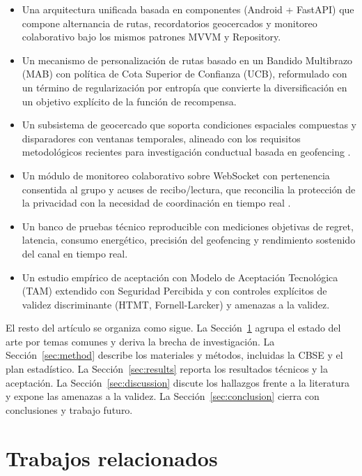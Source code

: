\documentclass[a4paper,fleqn]{cas-sc}
\newcommand{\UCB}{UCB\xspace}
\newcommand{\MAB}{MAB\xspace}
\newcommand{\TAM}{TAM\xspace}
\newcommand{\CBSE}{CBSE\xspace}
\newcommand{\MVVM}{MVVM\xspace}
\begin{document}
	\begin{itemize}
		\item Una arquitectura unificada basada en componentes (Android + FastAPI) que compone alternancia de rutas, recordatorios geocercados y monitoreo colaborativo bajo los mismos patrones \MVVM y Repository.
		\item Un mecanismo de personalizaci\'on de rutas basado en un Bandido Multibrazo (\MAB) con pol\'itica de Cota Superior de Confianza (\UCB), reformulado con un t\'ermino de regularizaci\'on por entrop\'ia que convierte la diversificaci\'on en un objetivo expl\'icito de la funci\'on de recompensa.
		\item Un subsistema de geocercado que soporta condiciones espaciales compuestas y disparadores con ventanas temporales, alineado con los requisitos metodol\'ogicos recientes para investigaci\'on conductual basada en geofencing \citep{shevchenko2024geofencing}.
		\item Un m\'odulo de monitoreo colaborativo sobre WebSocket con pertenencia consentida al grupo y acuses de recibo/lectura, que reconcilia la protecci\'on de la privacidad con la necesidad de coordinaci\'on en tiempo real \citep{li2017locsharing,mckenzie2022privyto}.
		\item Un banco de pruebas t\'ecnico reproducible con mediciones objetivas de regret, latencia, consumo energ\'etico, precisi\'on del geofencing y rendimiento sostenido del canal en tiempo real.
		\item Un estudio emp\'irico de aceptaci\'on con Modelo de Aceptaci\'on Tecnol\'ogica (\TAM) extendido con Seguridad Percibida y con controles expl\'icitos de validez discriminante (HTMT, Fornell-Larcker) y amenazas a la validez.
	\end{itemize}
	
	El resto del art\'iculo se organiza como sigue. La Secci\'on~\ref{sec:related} agrupa el estado del arte por temas comunes y deriva la brecha de investigaci\'on. La Secci\'on~\ref{sec:method} describe los materiales y m\'etodos, incluidas la \CBSE y el plan estad\'istico. La Secci\'on~\ref{sec:results} reporta los resultados t\'ecnicos y la aceptaci\'on. La Secci\'on~\ref{sec:discussion} discute los hallazgos frente a la literatura y expone las amenazas a la validez. La Secci\'on~\ref{sec:conclusion} cierra con conclusiones y trabajo futuro.
	
	\section{Trabajos relacionados}\label{sec:related}
	
\end{document}
